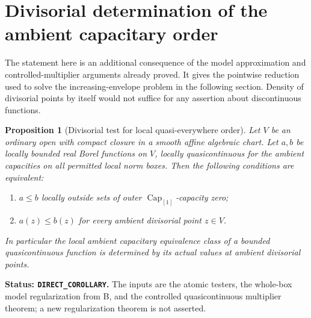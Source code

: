 \documentclass[11pt,a4paper]{article}
\numberwithin{equation}{section}
\newtheorem{proposition}[theorem]{Proposition}
\theoremstyle{definition}
\theoremstyle{remark}
\begin{document}


\section{Divisorial determination of the ambient capacitary order}
\label{sec:r2-divisorial-determination}

The statement here is an additional consequence of the model
approximation and controlled-multiplier arguments already proved.
It gives the pointwise reduction used to solve the
increasing-envelope problem in the following section. Density of divisorial points by itself
would not suffice for any assertion about discontinuous functions.

\begin{proposition}[Divisorial test for local quasi-everywhere order]
\label{prop:r2-divisorial-capacitary-order}
Let $V$ be an ordinary open with compact closure in a smooth
affine algebraic chart. Let $a,b$ be locally bounded real Borel
functions on $V$, locally quasicontinuous for the ambient
capacities on all permitted local norm boxes. Then the following
conditions are equivalent:
\begin{enumerate}[label=(\roman*)]
\item $a\leq b$ locally outside sets of outer
$\operatorname{Cap}_{[1]}$-capacity zero;
\item $a(z)\leq b(z)$ for every ambient divisorial point $z\in V$.
\end{enumerate}
In particular the local ambient capacitary equivalence class of
a bounded quasicontinuous function is determined by its actual
values at ambient divisorial points.
\end{proposition}

\noindent\textbf{Status: \texttt{DIRECT\_COROLLARY}.}
The inputs are the atomic testers, the whole-box model
regularization from B, and the controlled quasicontinuous
multiplier theorem; a new regularization theorem is not asserted.
\end{document}
